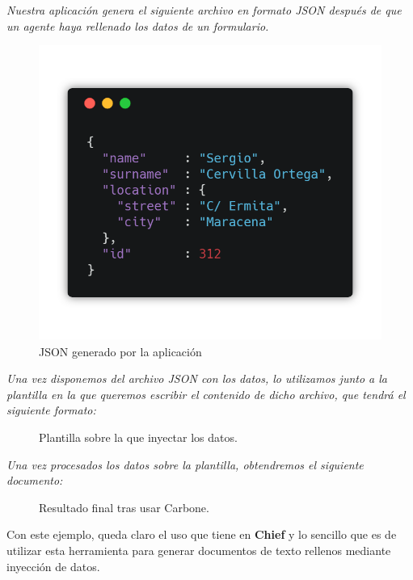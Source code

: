 \textit{Nuestra aplicación genera el siguiente archivo en formato JSON después de que un agente haya rellenado los datos de un formulario.}

\begin{figure}[H]
	\centering
	\includegraphics[scale=0.4]{imagenes/json-carbone.png}
	\caption{JSON generado por la aplicación \label{fig:figura10}}
\end{figure}
\newpage

\textit{Una vez disponemos del archivo JSON con los datos, lo utilizamos junto a la plantilla en la que queremos escribir el contenido de dicho archivo, que tendrá el siguiente formato: }

\begin{figure}[H]
	\centering
	\caption{Plantilla sobre la que inyectar los datos. \label{fig:figura11}}
\end{figure}

\textit{Una vez procesados los datos sobre la plantilla, obtendremos el siguiente documento:}
\begin{figure}[H]
	\centering
	\caption{Resultado final tras usar Carbone. \label{fig:figura12}}
\end{figure}

Con este ejemplo, queda claro el uso que tiene en \textbf{Chief} y lo sencillo que es de utilizar esta herramienta para generar documentos de texto rellenos mediante inyección de datos.

	
